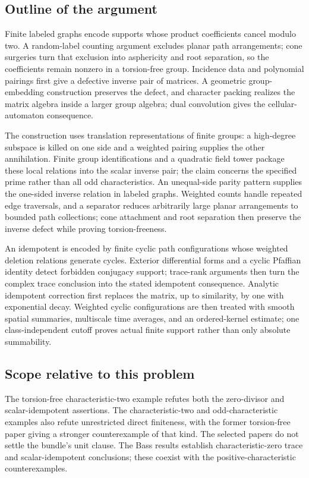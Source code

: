 \documentclass[11pt]{article}
\begin{document}
\subsection{Outline of the argument}
Finite labeled graphs encode supports whose product coefficients cancel modulo two. A random-label counting argument excludes planar path arrangements; cone surgeries turn that exclusion into asphericity and root separation, so the coefficients remain nonzero in a torsion-free group. Incidence data and polynomial pairings first give a defective inverse pair of matrices. A geometric group-embedding construction preserves the defect, and character packing realizes the matrix algebra inside a larger group algebra; dual convolution gives the cellular-automaton consequence.

The construction uses translation representations of finite groups: a high-degree subspace is killed on one side and a weighted pairing supplies the other annihilation. Finite group identifications and a quadratic field tower package these local relations into the scalar inverse pair; the claim concerns the specified prime rather than all odd characteristics. An unequal-side parity pattern supplies the one-sided inverse relation in labeled graphs. Weighted counts handle repeated edge traversals, and a separator reduces arbitrarily large planar arrangements to bounded path collections; cone attachment and root separation then preserve the inverse defect while proving torsion-freeness.

An idempotent is encoded by finite cyclic path configurations whose weighted deletion relations generate cycles. Exterior differential forms and a cyclic Pfaffian identity detect forbidden conjugacy support; trace-rank arguments then turn the complex trace conclusion into the stated idempotent consequence. Analytic idempotent correction first replaces the matrix, up to similarity, by one with exponential decay. Weighted cyclic configurations are then treated with smooth spatial summaries, multiscale time averages, and an ordered-kernel estimate; one class-independent cutoff proves actual finite support rather than only absolute summability.

\subsection{Scope relative to this problem}
The torsion-free characteristic-two example refutes both the zero-divisor and scalar-idempotent assertions. The characteristic-two and odd-characteristic examples also refute unrestricted direct finiteness, with the former torsion-free paper giving a stronger counterexample of that kind. The selected papers do not settle the bundle's unit clause. The Bass results establish characteristic-zero trace and scalar-idempotent conclusions; these coexist with the positive-characteristic counterexamples.
\end{document}
